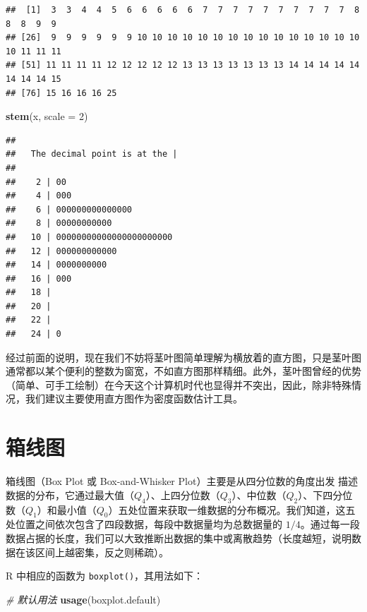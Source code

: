 \documentclass[
  b5paper,
  UTF8,twoside]{book}
\newenvironment{Shaded}{\begin{snugshade}}{\end{snugshade}}
\newcommand{\AttributeTok}[1]{\textcolor[rgb]{0.13,0.29,0.53}{#1}}
\newcommand{\CommentTok}[1]{\textcolor[rgb]{0.56,0.35,0.01}{\textit{#1}}}
\newcommand{\DecValTok}[1]{\textcolor[rgb]{0.00,0.00,0.81}{#1}}
\newcommand{\FunctionTok}[1]{\textcolor[rgb]{0.13,0.29,0.53}{\textbf{#1}}}
\newcommand{\NormalTok}[1]{#1}
\begin{document}
\begin{verbatim}
##  [1]  3  3  4  4  5  6  6  6  6  6  7  7  7  7  7  7  7  7  7  7  8  8  8  9  9
## [26]  9  9  9  9  9  9 10 10 10 10 10 10 10 10 10 10 10 10 10 10 10 10 11 11 11
## [51] 11 11 11 11 12 12 12 12 12 13 13 13 13 13 13 13 14 14 14 14 14 14 14 14 15
## [76] 15 16 16 16 25
\end{verbatim}

\begin{Shaded}
\begin{Highlighting}[]
\FunctionTok{stem}\NormalTok{(x, }\AttributeTok{scale =} \DecValTok{2}\NormalTok{)}
\end{Highlighting}
\end{Shaded}

\begin{verbatim}
## 
##   The decimal point is at the |
## 
##    2 | 00
##    4 | 000
##    6 | 000000000000000
##    8 | 00000000000
##   10 | 00000000000000000000000
##   12 | 000000000000
##   14 | 0000000000
##   16 | 000
##   18 | 
##   20 | 
##   22 | 
##   24 | 0
\end{verbatim}

经过前面的说明，现在我们不妨将茎叶图简单理解为横放着的直方图，只是茎叶图通常都以某个便利的整数为窗宽，不如直方图那样精细。此外，茎叶图曾经的优势（简单、可手工绘制）在今天这个计算机时代也显得并不突出，因此，除非特殊情况，我们建议主要使用直方图作为密度函数估计工具。

\section{箱线图}\label{sec:boxplot}

箱线图（Box Plot 或 Box-and-Whisker Plot）主要是从四分位数的角度出发
描述数据的分布，它通过最大值（\(Q_4\)）、上四分位数（\(Q_3\)）、中位数（\(Q_2\)）、下四分位数（\(Q_1\)）和最小值（\(Q_0\)）五处位置来获取一维数据的分布概况。我们知道，这五处位置之间依次包含了四段数据，每段中数据量均为总数据量的 \(1/4\)。通过每一段数据占据的长度，我们可以大致推断出数据的集中或离散趋势（长度越短，说明数据在该区间上越密集，反之则稀疏）。

R 中相应的函数为 \texttt{boxplot()}，其用法如下：

\begin{Shaded}
\begin{Highlighting}[]
\CommentTok{\# 默认用法}
\FunctionTok{usage}\NormalTok{(boxplot.default)}
\end{Highlighting}
\end{Shaded}
\end{document}
